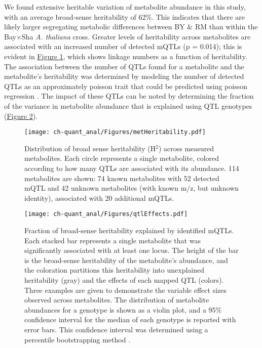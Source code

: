 We found extensive heritable variation of metabolite abundance in this study, with an average broad-sense heritability of 62\%.  This indicates that there are likely larger segregating metabolic differences between BY \& RM than within the Bay$\times$Sha \textit{A. thaliana} cross. Greater levels of heritability across metabolites are associated with an increased number of detected mQTLs (p = 0.014); this is evident in \hyperref[ch-quant_anal:metHeritability]{Figure \ref{ch-quant_anal:metHeritability}}, which shows linkage numbers as a function of heritability. The association between the number of QTLs found for a metabolite and the metabolite's heritability was determined by modeling the number of detected QTLs as an approximately poisson trait that could be predicted using poisson regression \cite{Cameron:2013tp}. The impact of these QTLs can be noted by determining the fraction of the variance in metabolite abundance that is explained using QTL genotypes (\hyperref[ch-quant_anal:qtlEffects]{Figure \ref{ch-quant_anal:qtlEffects}}).

\begin{figure}[h!]
\begin{center}
\texttt{[image: ch-quant\_anal/Figures/metHeritability.pdf]}
\caption[Distribution of broad sense heritability (H$^{2}$) across measured metabolites]{Distribution of broad sense heritability (H$^{2}$) across measured metabolites. Each circle represents a single metabolite, colored according to how many QTLs are associated with its abundance.  114 metabolites are shown: 74 known metabolites with 52 detected mQTL and 42 unknown metabolites (with known m/z, but unknown identity), associated with 20 additional mQTLs.}
\label{ch-quant_anal:metHeritability}
\end{center}
\end{figure}

\begin{figure}[h!]
\begin{center}
\texttt{[image: ch-quant\_anal/Figures/qtlEffects.pdf]}
\caption[Fraction of broad-sense heritability explained by identified mQTLs]{Fraction of broad-sense heritability explained by identified mQTLs.  Each stacked bar represents a single metabolite that was significantly associated with at least one locus.  The height of the bar is the broad-sense heritability of the metabolite's abundance, and the coloration partitions this heritability into unexplained heritability (gray) and the effects of each mapped QTL (colors).  Three examples are given to demonstrate the variable effect sizes observed across metabolites.  The distribution of metabolite abundances for a genotype is shown as a violin plot, and a 95\% confidence interval for the median of each genotype is reported with error bars.  This confidence interval was determined using a percentile bootstrapping method \cite{Davison:1997vn}.}
\label{ch-quant_anal:qtlEffects}
\end{center}
\end{figure}

